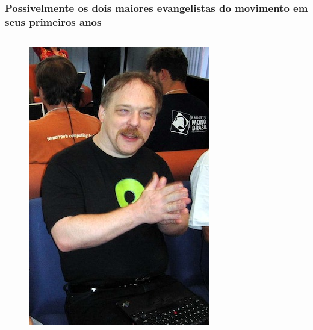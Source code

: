 \documentclass[xcolor=dvipsnames]{beamer}
\begin{document}
 \begin{frame}
 	\frametitle{Possivelmente os dois maiores evangelistas do movimento em seus primeiros anos}
 
 	\begin{columns}
 \begin{column}{4.5cm}
 	\begin{figure}
 	\includegraphics[scale=0.3]{esr.jpg}\\
 	\end{figure}
 \end{column}
 \begin{column}[c]{4.5cm}
 	\begin{figure}

\end{figure}
\end{column}
\end{columns}
\end{frame}
\end{document}
